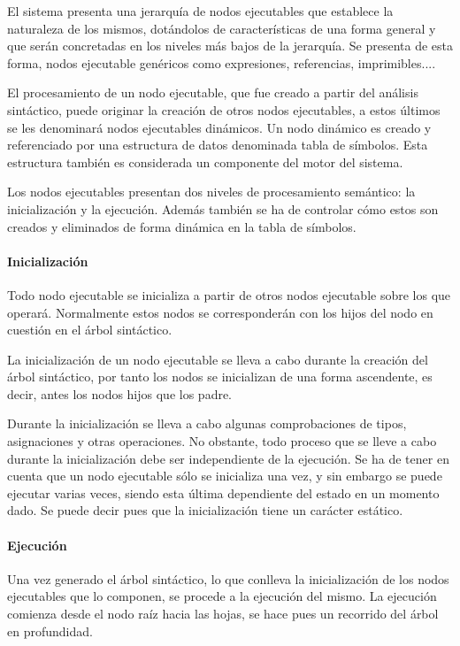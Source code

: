 El sistema presenta una jerarquía de nodos ejecutables que establece la naturaleza de los mismos, dotándolos de características de una forma general y que serán concretadas en los niveles más
bajos de la jerarquía. Se presenta de esta forma, nodos ejecutable genéricos como expresiones, referencias, imprimibles....

El procesamiento de un nodo ejecutable, que fue creado a partir del análisis sintáctico, puede originar la creación de otros nodos ejecutables, a estos 
últimos se les denominará nodos ejecutables dinámicos. Un nodo dinámico es creado y referenciado por una estructura de datos denominada tabla de símbolos. 
Esta estructura también es considerada un componente del motor del sistema.

Los nodos ejecutables presentan dos niveles de procesamiento semántico: la inicialización y la ejecución. Además también se ha de controlar cómo estos son creados y eliminados de 
forma dinámica en la tabla de símbolos. 



\paragraph{Inicialización}
Todo nodo ejecutable se inicializa a partir de otros nodos ejecutable sobre los que operará. Normalmente estos nodos se corresponderán con los hijos del nodo en cuestión en el árbol sintáctico. 

La inicialización de un nodo ejecutable se lleva a cabo durante la creación del árbol sintáctico, por tanto los nodos se inicializan de una forma ascendente, es decir,
antes los nodos hijos que los padre.

Durante la inicialización se lleva a cabo algunas comprobaciones de tipos, asignaciones y otras operaciones. No obstante, todo proceso que se lleve a cabo durante la
inicialización debe ser independiente de la ejecución. Se ha de tener en cuenta que un nodo ejecutable sólo se inicializa una vez, y sin embargo se puede ejecutar varias
veces, siendo esta última dependiente del estado en un momento dado. Se puede decir pues que la inicialización tiene un carácter estático.

\paragraph{Ejecución}
Una vez generado el árbol sintáctico, lo que conlleva la inicialización de los nodos ejecutables que lo componen, se procede a la ejecución del mismo. La ejecución comienza desde el 
nodo raíz hacia las hojas, se hace pues un recorrido del árbol en profundidad.

